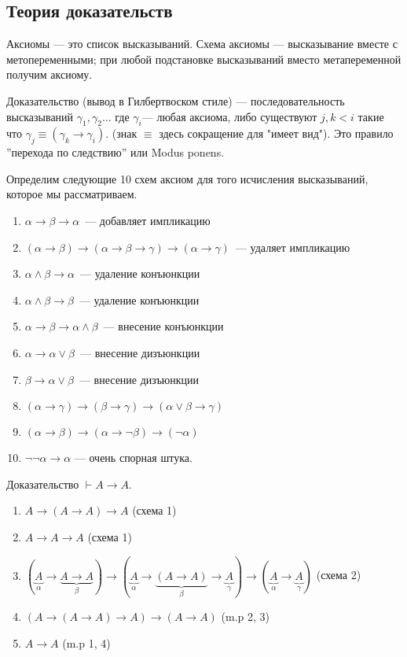 \subsection{Теория доказательств}
\begin{definition}
    Аксиомы --- это список высказываний.
    Схема аксиомы --- высказывание вместе с метопеременными; при любой подстановке высказываний вместо метапеременной получим аксиому.
\end{definition}

\begin{definition}
    Доказательство (вывод в Гилбертвоском стиле) --- последовательность высказываний $\gamma_1, \gamma_2\ldots$ где $\gamma_i$--- любая аксиома,
    либо существуют $j,k < i$ такие что $\gamma_j \equiv (\gamma_k \to \gamma_i)$.
    (знак $\equiv$ здесь сокращение для "имеет вид"). Это правило ''перехода по следствию'' или Modus ponens.
\end{definition}

Определим следующие 10 схем аксиом для того исчисления высказываний, которое мы рассматриваем.
\begin{enumerate}
    \item $\alpha \to \beta \to \alpha$~--- добавляет импликацию
    \item $(\alpha \to \beta) \to (\alpha \to \beta \to \gamma) \to (\alpha \to \gamma)$~--- удаляет импликацию
    \item $\alpha \land \beta \to \alpha$~--- удаление конъюнкции
    \item $\alpha \land \beta \to \beta$~--- удаление конъюнкции
    \item $\alpha \to \beta \to \alpha \land \beta$~--- внесение конъюнкции
    \item $\alpha \to \alpha \lor \beta$~--- внесение дизъюнкции
    \item $\beta \to \alpha \lor \beta$~--- внесение дизъюнкции
    \item $(\alpha \to \gamma) \to (\beta \to \gamma) \to (\alpha \lor \beta \to \gamma)$
    \item $(\alpha \to \beta) \to (\alpha \to \neg \beta) \to (\neg \alpha)$
    \item $\neg \neg \alpha \to \alpha$ --- очень спорная штука.
\end{enumerate}

\begin{example} Доказательство
    $\vdash A \to A $.
    \begin{enumerate}
        \item $A \to (A \to A) \to A$ (схема 1)
        \item $A \to A \to A$  (схема 1)
        \item $(\underbrace{A}_\alpha \to \underbrace{A \to A}_\beta) \to (\underbrace{A}_\alpha \to \underbrace{(A \to A)}_\beta \to \underbrace{A}_\gamma) \to (\underbrace{A}_\alpha \to \underbrace{A}_\gamma)$  (схема 2)
        \item $(A \to (A \to A) \to A) \to (A \to A)$ (m.p 2, 3)
        \item $A \to A$ (m.p 1, 4)
    \end{enumerate}
\end{example}